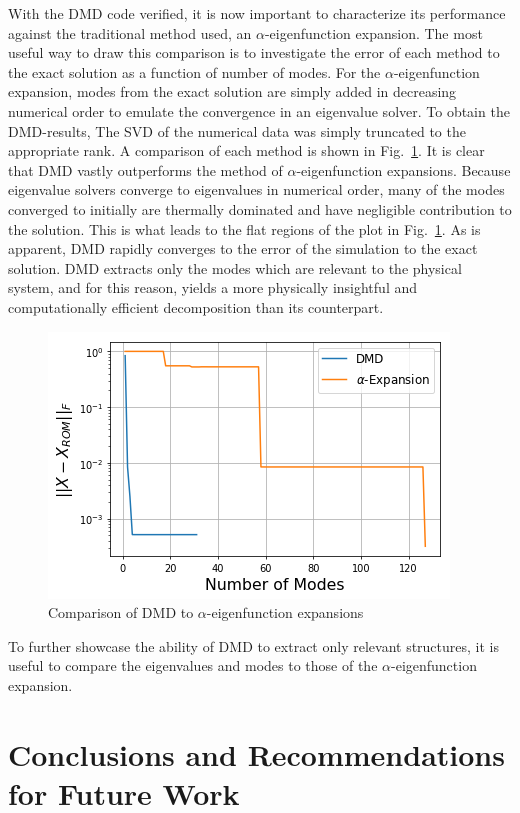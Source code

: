 \documentclass[12pt]{article}
\newcommand{\LFI}[1]{\label{fi:#1}}
\newcommand{\FI}[1]{Fig.~\ref{fi:#1}}
\newcommand{\bfg}{\begin{figure}}
\newcommand{\efg}{\end{figure}}
\begin{document}
With the DMD code verified, it is now important to characterize its performance 
 against the traditional method used, an $\alpha$-eigenfunction expansion.
The most useful way to draw this comparison is to investigate the error of each 
 method to the exact solution as a function of number of modes.
For the $\alpha$-eigenfunction expansion, modes from the exact solution are 
 simply added in decreasing numerical order to emulate the convergence in an eigenvalue solver.
To obtain the DMD-results, The SVD of the numerical data was simply truncated 
 to the appropriate rank.
A comparison of each method is shown in \FI{comp}. It is clear that DMD vastly 
 outperforms the method of $\alpha$-eigenfunction expansions.
Because eigenvalue solvers converge to eigenvalues in numerical order, many of 
 the modes converged to initially are thermally dominated and have negligible 
 contribution to the solution. 
This is what leads to the flat regions of the plot in \FI{comp}. 
As is apparent, DMD rapidly converges to the error of the simulation to the exact solution.
DMD extracts only the modes which are relevant to the physical system, and for 
 this reason, yields a more physically insightful and computationally 
 efficient decomposition than its counterpart.

\bfg[!htb] \centering
	\includegraphics[scale=0.5]{method_comparison.png}
	\caption{Comparison of DMD to $\alpha$-eigenfunction expansions}
	\LFI{comp}
\efg

To further showcase the ability of DMD to extract only relevant structures, it 
 is useful to compare the eigenvalues and modes to those of the 
 $\alpha$-eigenfunction expansion.


\section{Conclusions and Recommendations for Future Work}


\end{document}

